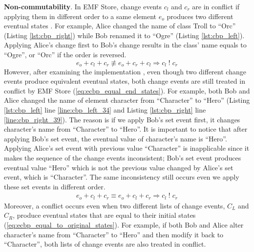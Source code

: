 \textbf{Non-commutability}. In EMF Store, change events $c_{l}$ and $c_{r}$ are in conflict if applying them in different order to a same element $e_{o}$ produces two different eventual states \cite{koegel2010operation}. For example, Alice changed the \textsf{name} of class \textsf{Troll} to ``Orc'' (Listing \ref{lst:cbp_right}) while Bob renamed it to ``Ogre'' (Listing \ref{lst:cbp_left}). Applying Alice's change first to Bob's change results in the class' \textsf{name} equals to ``Ogre'', or ``Orc'' if the order is reversed.
\begin{equation} \label{eq:change_noncommutability}
e_{o} + c_{l} + c_{r} \not\equiv e_{o} + c_{r} + c_{l} \Rightarrow c_{l}\;!\;c_{r}
\end{equation} 
However, after examining the implementation \cite{eclipse2019emfstore}, even though two different change events produce equivalent eventual states, both change events are still treated in conflict by EMF Store (\ref{eq:ecbp_equal_end_states}). For example, both Bob and Alice changed the \textsf{name} of element \textsf{character} from ``Character'' to ``Hero'' (Listing \ref{lst:cbp_left} line \ref{line:cbp_left_34} and Listing \ref{lst:cbp_right} line \ref{line:cbp_right_39}). The reason is if we apply Bob's set event first, it changes \textsf{character}'s \textsf{name} from ``Character'' to ``Hero''. It is important to notice that after applying Bob's set event, the eventual value of \textsf{character}'s \textsf{name} is ``Hero''. Applying Alice's set event with previous value ``Character'' is inapplicable since it makes the sequence of the change events inconsistent; Bob's set event produces eventual value ``Hero'' which is not the previous value changed by Alice's set event, which is ``Character''. The same inconsistency still occurs even we apply these set events in different order.
\begin{equation} \label{eq:ecbp_equal_end_states}
\begin{split}
	e_{o} + c_{l} + c_{r} \equiv e_{o} + c_{l} + c_{r} \Rightarrow c_{l}\;!\;c_{r}
\end{split}
\end{equation} 
Moreover, a conflict occurs even when two different lists of change events, $C_{L}$ and $C_{R}$, produce eventual states that are equal to their initial states (\ref{eq:ecbp_equal_to_original_states}). For example, if both Bob and Alice alter \textsf{character}'s \textsf{name} from ``Character'' to ``Hero'' and then modify it back to ``Character'', both lists of change events are also treated in conflict.
